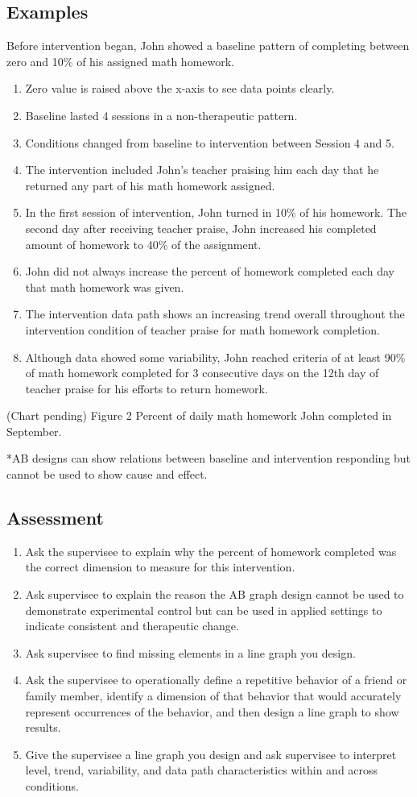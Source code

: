 \subsection{Examples}
Before intervention began, John showed a baseline pattern of completing between zero and 10\% of his assigned math homework.
\begin{enumerate}
\item Zero value is raised above the x-axis to see data points clearly.
\item Baseline lasted 4 sessions in a non-therapeutic pattern.
\item Conditions changed from baseline to intervention between Session 4 and 5.
\item The intervention included John's teacher praising him each day that he returned any part of his math homework assigned. 
\item In the first session of intervention, John turned in 10\% of his homework. The second day after receiving teacher praise, John increased his completed amount of homework to 40\% of the assignment. 
\item John did not always increase the percent of homework completed each day that math homework was given.
\item The intervention data path shows an increasing trend overall throughout the intervention condition of teacher praise for math homework completion. 
\item Although data showed some variability, John reached criteria of at least 90\% of math homework completed for 3 consecutive days on the 12th day of teacher praise for his efforts to return homework.
\end{enumerate}
%
(Chart pending) Figure 2    Percent of daily math homework John completed in September.

*AB designs can show relations between baseline and intervention responding but cannot be used to show cause and effect.
%
\subsection{Assessment}
\begin{enumerate}
\item Ask the supervisee to explain why the percent of homework completed was the correct dimension to measure for this intervention.
\item Ask supervisee to explain the reason the AB graph design cannot be used to demonstrate experimental control but can be used in applied settings to indicate consistent and therapeutic change.
\item Ask supervisee to find missing elements in a line graph you design.
\item Ask the supervisee to operationally define a repetitive behavior of a friend or family member, identify a dimension of that behavior that would accurately represent occurrences of the behavior, and then design a line graph to show results.
\item Give the supervisee a line graph you design and ask supervisee to interpret level, trend, variability, and data path characteristics within and across conditions. 
\end{enumerate}
%
